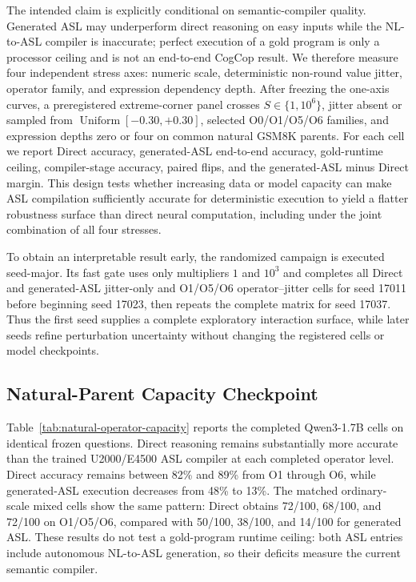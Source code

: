\documentclass[11pt]{article}
\begin{document}
The intended claim is explicitly conditional on semantic-compiler quality.
Generated ASL may underperform direct reasoning on easy inputs while the
NL-to-ASL compiler is inaccurate; perfect execution of a gold program is only
a processor ceiling and is not an end-to-end CogCop result. We therefore
measure four independent stress axes: numeric scale, deterministic non-round
value jitter, operator family, and expression dependency depth. After freezing
the one-axis curves, a preregistered extreme-corner panel crosses
$S\in\{1,10^6\}$, jitter absent or sampled from
$\operatorname{Uniform}[-0.30,+0.30]$, selected O0/O1/O5/O6 families, and
expression depths zero or four on common natural GSM8K parents. For each cell
we report Direct accuracy, generated-ASL end-to-end accuracy, gold-runtime
ceiling, compiler-stage accuracy, paired flips, and the generated-ASL minus
Direct margin. This design tests whether increasing data or model capacity can
make ASL compilation sufficiently accurate for deterministic execution to
yield a flatter robustness surface than direct neural computation, including
under the joint combination of all four stresses.

To obtain an interpretable result early, the randomized campaign is executed
seed-major. Its fast gate uses only multipliers $1$ and $10^3$ and completes
all Direct and generated-ASL jitter-only and O1/O5/O6 operator--jitter cells for
seed 17011 before beginning seed 17023, then repeats the complete matrix for
seed 17037. Thus the first seed supplies a complete exploratory interaction
surface, while later seeds refine perturbation uncertainty without changing
the registered cells or model checkpoints.

\subsection{Natural-Parent Capacity Checkpoint}

Table~\ref{tab:natural-operator-capacity} reports the completed Qwen3-1.7B
cells on identical frozen questions. Direct reasoning remains substantially
more accurate than the trained U2000/E4500 ASL compiler at each completed
operator level. Direct accuracy remains between 82\% and 89\% from O1 through
O6, while generated-ASL execution decreases from 48\% to 13\%. The matched
ordinary-scale mixed cells show the same pattern: Direct obtains 72/100,
68/100, and 72/100 on O1/O5/O6, compared with 50/100, 38/100, and 14/100 for
generated ASL. These results
do not test a gold-program runtime ceiling: both ASL entries include autonomous
NL-to-ASL generation, so their deficits measure the current semantic compiler.
\end{document}
